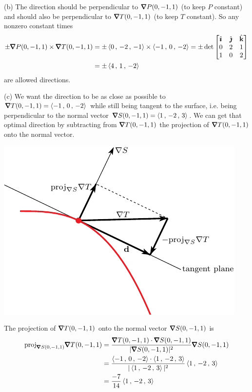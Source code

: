 \begin{solution}
(b)
The direction should be perpendicular to $\vnabla P(0,-1,1)$
(to keep $P$ constant) and should also be perpendicular to
$\vnabla T(0,-1,1)$ (to keep $T$ constant). So any nonzero constant times
\begin{align*}
\pm \vnabla P(0,-1,1) \times \vnabla T(0,-1,1)
&=\pm \llt 0 \,,\, -2 \,,\, -1\rgt  \times  \llt -1\,,\,0 \,,\,- 2\rgt
=\pm \det\left[\begin{matrix}
                     \hi & \hj & \hk \\
                     0   &  2  & 1 \\
                     1   &  0  & 2
                \end{matrix}\right] \\
&=\pm \llt  4\,,\,  1 \,,\, -2\rgt
\end{align*}
are allowed directions.

(c) We want the direction to be as close as possible to $\vnabla T(0,-1,1)
=\llt  -1 \,,\, 0 \,,\, -2\rgt$ while still being tangent to the surface, 
i.e. being perpendicular to the normal vector 
$\vnabla S(0,-1,1)=\llt 1 \,,\, -2 \,,\, 3\rgt$.
We can get that optimal direction by subtracting from $\vnabla T(0,-1,1)$
the projection of $\vnabla T(0,-1,1)$ onto the normal vector.

\begin{center}
     \includegraphics{fig/OE14A_2.pdf}
\end{center}

The projection of $\vnabla T(0,-1,1)$ onto the normal vector
$\vnabla S(0,-1,1)$ is
\begin{align*}
\text{proj}_{\vnabla S(0,-1,1)}\vnabla T(0,-1,1)
&=\frac{\vnabla T(0,-1,1)\cdot \vnabla S(0,-1,1)}
         {|\vnabla S(0,-1,1)|^2}\vnabla S(0,-1,1) \\
&=\frac{\llt -1\,,\,0 \,,\,- 2\rgt\cdot \llt 1\,,\, -2 \,,\,3\rgt}
         {|\llt 1\,,\, -2 \,,\,3\rgt|^2}\llt 1\,,\, -2 \,,\,3\rgt \\
&=\frac{-7}{14}\llt 1\,,\, -2 \,,\,3\rgt
\end{align*}


\end{solution}
